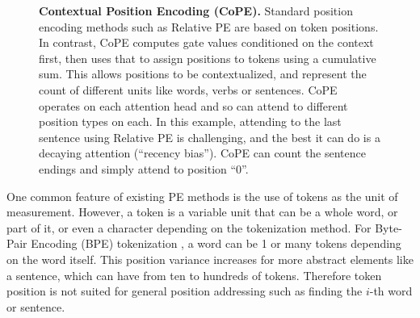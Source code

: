 \documentclass{article}
\newcommand{\ours}{CoPE\xspace}
\begin{document}
\begin{figure}[t]
    \centering
    \resizebox{1\linewidth}{!}{}

    \caption{{\bf Contextual Position Encoding (\ours{}).} Standard position encoding methods such as Relative PE are based on token positions. In contrast, \ours{} computes gate values conditioned on the context first, then uses that to assign positions to tokens using a cumulative sum. This allows positions to be contextualized, and represent the count of different units like words, verbs or sentences. CoPE operates on each attention head and so can attend to different position types on each. 
    In this example, attending to the last sentence using Relative PE is challenging, and the best it can do is a decaying attention (``recency bias''). \ours{}  can count the sentence endings and simply attend to position ``0''. }
    \label{fig:main}
\end{figure}

One common feature of existing PE methods is the use of tokens as the unit of measurement.
However, a token is a variable unit that can be a whole word, or part of it, or even a character depending on the tokenization method. 
For Byte-Pair Encoding (BPE) tokenization \citep{sennrich2015neural}, a word can be 1 or many tokens depending on the word itself.
This position variance increases for more abstract elements like a sentence, which can have from ten to hundreds of tokens.
Therefore token position is not suited for general position addressing such as finding the $i$-th word or sentence.
\end{document}
